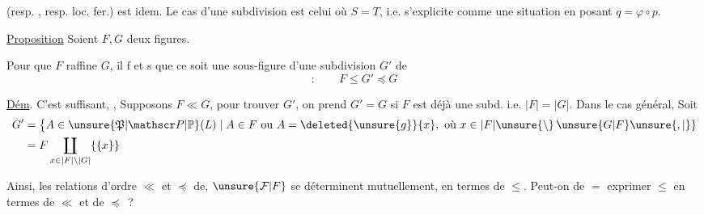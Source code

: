 (resp. , resp. loc. fer.) est idem. Le cas d'une subdivision est celui où $S=T$, i.e. s'explicite comme une situation
en posant $q=\varphi\circ p$.

\uline{Proposition} Soient $F,G$ deux figures.

 Pour que $F$ raffine $G$, il f et s que ce soit une sous-figure d'une subdivision $G'$ de 
\[
 :\qquad F\leq G'\preceq G
\]


\uline{Dém}. C'est  suffisant, , Supposons $F\ll G$, pour trouver $G'$, on prend $G'=G$ si $F$ est déjà une subd. i.e. $|F|=|G|$.  Dans le cas général, Soit
\[
\begin{aligned}
 G'&=\bigl\{A\in\unsure{\mathfrak P|\mathscr P|\mathbb P}(L)\mid A\in F\text{ ou }A=\deleted{\unsure{g}}\{x\},\text{ où }x\in |F|\unsure{\setminus}\,\unsure{G|F}\unsure{,|\}}\\
   &=F\coprod_{x\in |F|\setminus |G|}\{\{x\}\}
\end{aligned}
\]


Ainsi, les relations d'ordre $\ll$ et $\preceq$ de, $\unsure{\mathcal F|F}$ se déterminent mutuellement, en termes de $\leq$. Peut-on de $=$ exprimer $\leq$ en termes de $\ll$ et de $\preceq$~?

